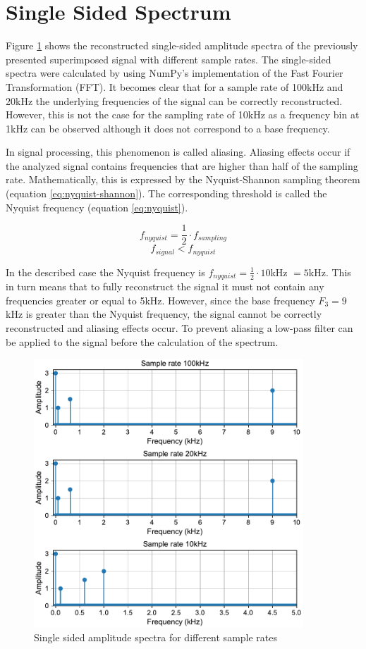 \documentclass{scrartcl}
\begin{document}
\section{Single Sided Spectrum}

Figure \ref{fig:spectra} shows the reconstructed single-sided amplitude spectra of the previously presented superimposed signal with different sample rates. The single-sided spectra were calculated by using NumPy's implementation of the Fast Fourier Transformation (FFT). It becomes clear that for a sample rate of 100kHz and 20kHz the underlying frequencies of the signal can be correctly reconstructed. However, this is not the case for the sampling rate of 10kHz as a frequency bin at 1kHz can be observed although it does not correspond to a base frequency.

In signal processing, this phenomenon is called aliasing. Aliasing effects occur if the analyzed signal contains frequencies that are higher than half of the sampling rate. Mathematically, this is expressed by the Nyquist-Shannon sampling theorem (equation \ref{eq:nyquist-shannon}). The corresponding threshold is called the Nyquist frequency (equation \ref{eq:nyquist}).

\begin{equation}
	\label{eq:nyquist}
	f_{nyquist} = \frac{1}{2}\cdot f_{sampling}
\end{equation}
\begin{equation}
	\label{eq:nyquist-shannon}
	f_{signal} < f_{nyquist}
\end{equation}

In the described case the Nyquist frequency is $f_{nyquist} = \frac{1}{2}\cdot 10$kHz $= 5$kHz. This in turn means that to fully reconstruct the signal it must not contain any frequencies greater or equal to 5kHz. However, since the base frequency $F_{3} = 9$kHz is greater than the Nyquist frequency, the signal cannot be correctly reconstructed and aliasing effects occur. To prevent aliasing a low-pass filter can be applied to the signal before the calculation of the spectrum.

\begin{figure}[p]
	\centering
	\includegraphics[width=0.9\textwidth]{figures/spectra.pdf}
	\caption{Single sided amplitude spectra for different sample rates}
	\label{fig:spectra}
\end{figure}
\end{document}
